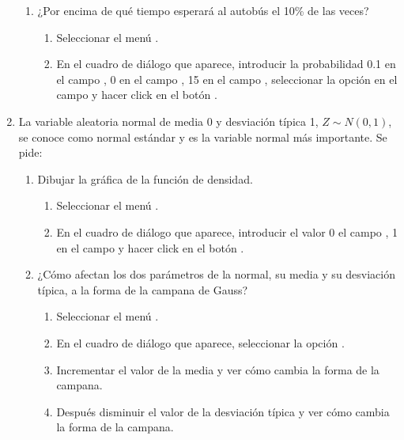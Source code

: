 \begin{enumerate}[leftmargin=*]
\begin{enumerate}
\item ¿Por encima de qué tiempo esperará al autobús el 10\% de las veces?
\begin{indicacion}
\begin{enumerate}
\item Seleccionar el menú .
\item En el cuadro de diálogo que aparece, introducir la probabilidad 0.1 en el campo ,
0 en el campo , 15 en el campo , seleccionar la opción  en el campo
 y hacer click en el botón .
\end{enumerate}
\end{indicacion}
\end{enumerate}

\item La variable aleatoria normal de media 0 y desviación típica 1, $Z\sim N(0,1)$, se conoce como normal estándar y es
la variable normal más importante. 
Se pide:
\begin{enumerate}
\item Dibujar la gráfica de la función de densidad. 
\begin{indicacion}
\begin{enumerate}
\item Seleccionar el menú .
\item En el cuadro de diálogo que aparece, introducir el valor 0 el campo , 1 en el campo  y hacer click en el botón .
\end{enumerate}
\end{indicacion}

\item ¿Cómo afectan los dos parámetros de la normal, su media y su desviación típica, a la forma de la campana de Gauss?
\begin{indicacion}
\begin{enumerate}
\item Seleccionar el menú .
\item En el cuadro de diálogo que aparece, seleccionar la opción .
\item Incrementar el valor de la media y ver cómo cambia la forma de la campana.
\item Después disminuir el valor de la desviación típica y ver cómo cambia la forma de la campana.
\end{enumerate}
\end{indicacion}


\end{enumerate}
\end{enumerate}
